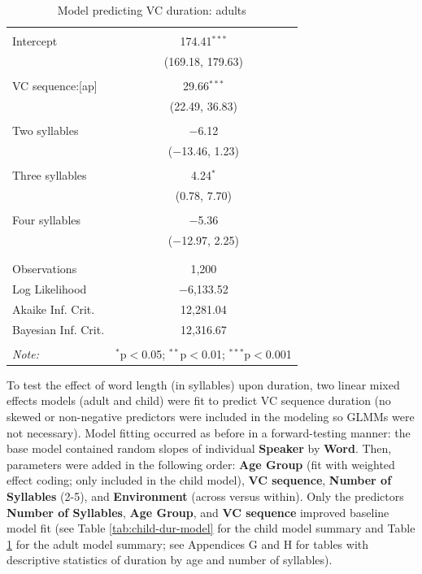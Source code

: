 \documentclass[a4paper,man,floatsintext,natbib,donotrepeattitle, apacite]{apa6}
\begin{document}
\begin{table}[!htbp] \centering 
  \caption{Model predicting VC duration: adults} 
  \label{tab:adult-dur-model} 
\begin{tabular}{@{\extracolsep{5pt}}lc} 
\\[-1.8ex]\hline 
\hline \\[-1.8ex] 
 Intercept & 174.41$^{***}$ \\ 
  & (169.18, 179.63) \\ 
  & \\ 
 VC sequence:[ap] & 29.66$^{***}$ \\ 
  & (22.49, 36.83) \\ 
  & \\ 
 Two syllables & $-$6.12 \\ 
  & ($-$13.46, 1.23) \\ 
  & \\ 
 Three syllables & 4.24$^{*}$ \\ 
  & (0.78, 7.70) \\ 
  & \\ 
 Four syllables & $-$5.36 \\ 
  & ($-$12.97, 2.25) \\ 
  & \\ 
\hline \\[-1.8ex] 
Observations & 1,200 \\ 
Log Likelihood & $-$6,133.52 \\ 
Akaike Inf. Crit. & 12,281.04 \\ 
Bayesian Inf. Crit. & 12,316.67 \\ 
\hline 
\hline \\[-1.8ex] 
\textit{Note:}  & \multicolumn{1}{r}{$^{*}$p$<$0.05; $^{**}$p$<$0.01; $^{***}$p$<$0.001} \\ 
\end{tabular} 
\end{table}

To test the effect of word length (in syllables) upon duration, two linear mixed effects models (adult and child) were fit to predict VC sequence duration (no skewed or non-negative predictors were included in the modeling so GLMMs were not necessary). Model fitting occurred as before in a forward-testing manner: the base model contained random slopes of individual \textbf{Speaker} by \textbf{Word}. Then, parameters were added in the following order: \textbf{Age Group} (fit with weighted effect coding; only included in the child model), \textbf{VC sequence}, \textbf{Number of Syllables} (2-5), and \textbf{Environment} (across versus within). Only the predictors \textbf{Number of Syllables}, \textbf{Age Group}, and \textbf{VC sequence} improved baseline model fit (see Table \ref{tab:child-dur-model} for the child model summary and Table \ref{tab:adult-dur-model} for the adult model summary; see Appendices G and H for tables with descriptive statistics of duration by age and number of syllables).
\end{document}
